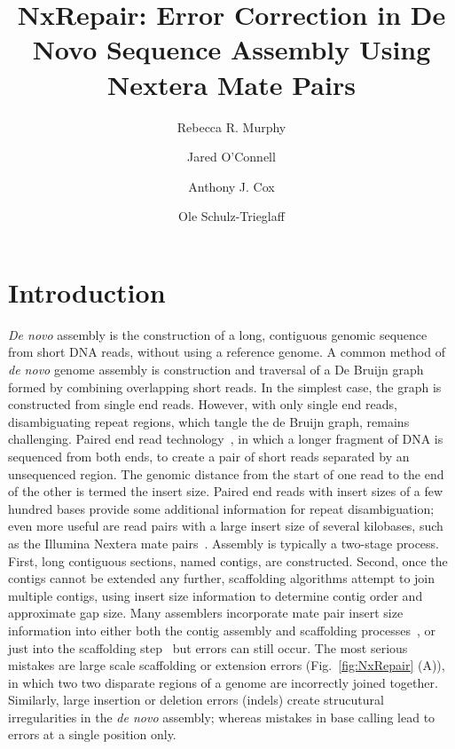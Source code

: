 \documentclass[fleqn,10pt]{wlpeerj}
\title{NxRepair: Error Correction in De Novo Sequence Assembly Using Nextera Mate Pairs}
\author[1]{Rebecca R. Murphy}
\author[2]{Jared O'Connell}
\author[2]{Anthony J. Cox}
\author[2]{Ole Schulz-Trieglaff}
\affil[1]{Department of Chemistry, University of Cambridge, UK}
\affil[2]{Illumina Cambridge, Chesterford Research Park, Essex, CB10 1XL}
\begin{document}
\flushbottom
\maketitle
\thispagestyle{empty}

\section*{Introduction}

\textit{De novo} assembly is the construction of a long, contiguous genomic sequence from short DNA reads, without using a reference genome. A common method of \textit{de novo} genome assembly is construction and traversal of a De Bruijn graph~\citep{compeau2011} formed by combining overlapping short reads. In the simplest case, the graph is constructed from single end reads. However, with only single end reads, disambiguating repeat regions, which tangle the de Bruijn graph, remains challenging. Paired end read technology~\citep{Fullwood2009}, in which a longer fragment of DNA is sequenced from both ends, to create a pair of short reads separated by an unsequenced region. The genomic distance from the start of one read to the end of the other is termed the insert size. Paired end reads with insert sizes of a few hundred bases provide some additional information for repeat disambiguation; even more useful are read pairs with a large insert size of several kilobases, such as the Illumina Nextera mate pairs~\citep{nextera2012}. Assembly is typically a two-stage process. First, long contiguous sections, named contigs, are constructed. Second, once the contigs cannot be extended any further, scaffolding algorithms attempt to join multiple contigs, using insert size information to determine contig order and approximate gap size. Many assemblers incorporate mate pair insert size information into either both the contig assembly and scaffolding processes~\citep{Bankevich2012}, or just into the scaffolding step~\citep{zerbino2008} but errors can still occur. The most serious mistakes are large scale scaffolding or extension errors (Fig.~\ref{fig:NxRepair} (A)), in which two two disparate regions of a genome are incorrectly joined together. Similarly, large insertion or deletion errors (indels) create strucutural irregularities in the \textit{de novo} assembly; whereas mistakes in base calling lead to errors at a single position only. 
\end{document}
